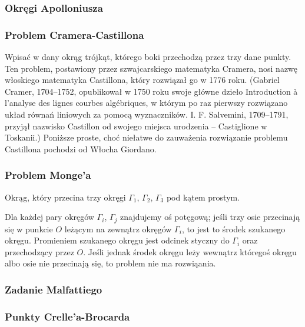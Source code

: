 \subsubsection{Okręgi Apolloniusza}

\subsubsection{Problem Cramera-Castillona}
Wpisać w dany okrąg trójkąt, którego boki przechodzą przez trzy dane punkty.
Ten problem, postawiony przez szwajcarskiego matematyka Cramera, nosi nazwę włoskiego matematyka Castillona, który rozwiązał go w 1776 roku.
(Gabriel Cramer, 1704–1752, opublikował w 1750 roku swoje główne dzieło Introduction à l’analyse des lignes courbes algébriques, w którym po raz pierwszy rozwiązano układ równań liniowych za pomocą wyznaczników.
I. F. Salvemini, 1709–1791, przyjął nazwisko Castillon od swojego miejsca urodzenia – Castiglione w Toskanii.)
Poniższe proste, choć niełatwe do zauważenia rozwiązanie problemu Castillona pochodzi od Włocha Giordano.


\subsubsection{Problem Monge'a}
\begin{problem}[Monge'a?]
    Okrąg, który przecina trzy okręgi $\Gamma_1$, $\Gamma_2$, $\Gamma_3$ pod kątem prostym.
\end{problem}

Dla każdej pary okręgów $\Gamma_i$, $\Gamma_j$ znajdujemy oś potęgową; jeśli trzy osie przecinają się w punkcie $O$ leżącym na zewnątrz okręgów $\Gamma_i$, to jest to środek szukanego okręgu.
Promieniem szukanego okręgu jest odcinek styczny do $\Gamma_i$ oraz przechodzący przez $O$.
Jeśli jednak środek okręgu leży wewnątrz któregoś okręgu albo osie nie przecinają się, to problem nie ma rozwiąania.

\subsubsection{Zadanie Malfattiego}


\subsubsection{Punkty Crelle'a-Brocarda}
